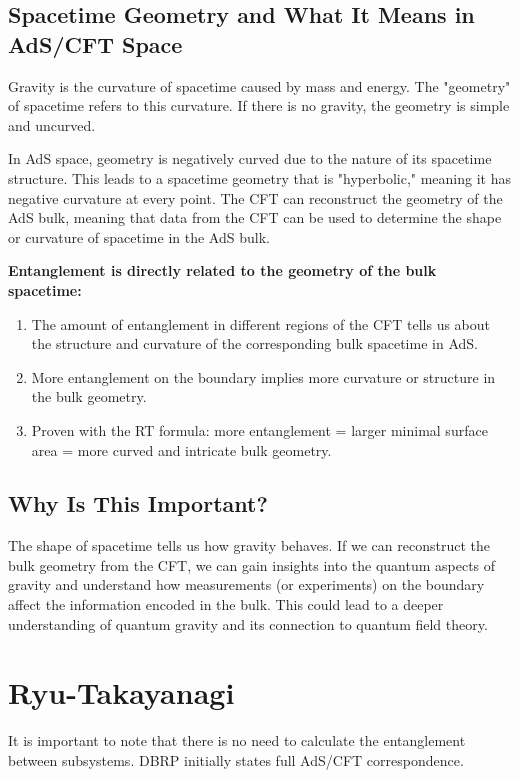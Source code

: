 \documentclass[12pt]{article}
\begin{document}
    \subsection{Spacetime Geometry and What It Means in AdS/CFT Space}
        \hspace{0.5cm} Gravity is the curvature of spacetime caused by mass and energy. The "geometry" of spacetime refers to this curvature. If there is no gravity, the geometry is simple and uncurved.

        In AdS space, geometry is negatively curved due to the nature of its spacetime structure. This leads to a spacetime geometry that is "hyperbolic," meaning it has negative curvature at every point. The CFT can reconstruct the geometry of the AdS bulk, meaning that data from the CFT can be used to determine the shape or curvature of spacetime in the AdS bulk.

        \textbf{Entanglement is directly related to the geometry of the bulk spacetime:}
        \begin{enumerate}
            \item The amount of entanglement in different regions of the CFT tells us about the structure and curvature of the corresponding bulk spacetime in AdS.
            \item More entanglement on the boundary implies more curvature or structure in the bulk geometry.
            \item Proven with the RT formula: more entanglement = larger minimal surface area = more curved and intricate bulk geometry.
        \end{enumerate}

    \subsection{Why Is This Important?}
        \hspace{0.5cm} The shape of spacetime tells us how gravity behaves. If we can reconstruct the bulk geometry from the CFT, we can gain insights into the quantum aspects of gravity and understand how measurements (or experiments) on the boundary affect the information encoded in the bulk. This could lead to a deeper understanding of quantum gravity and its connection to quantum field theory.

\section{Ryu-Takayanagi}
        \hspace{.5cm} It is important to note that there is no need to calculate the entanglement between subsystems. DBRP initially states full AdS/CFT correspondence.
\end{document}
